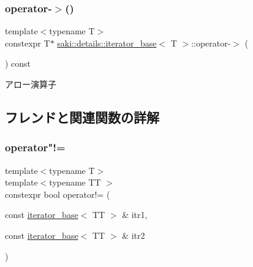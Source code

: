 \subsubsection{\texorpdfstring{operator-\/$>$()}{operator->()}}
{\footnotesize\ttfamily template$<$typename T$>$ \\
constexpr T$\ast$ \mbox{\hyperlink{classsaki_1_1details_1_1iterator__base}{saki\+::details\+::iterator\+\_\+base}}$<$ T $>$\+::operator-\/$>$ (\begin{DoxyParamCaption}{ }\end{DoxyParamCaption}) const\hspace{0.3cm}{\ttfamily [inline]}}



アロー演算子 



\subsection{フレンドと関連関数の詳解}
\mbox{\label{classsaki_1_1details_1_1iterator__base_a347d4c8755f8c350aa9c0151165549f2}} 
\subsubsection{\texorpdfstring{operator"!=}{operator!=}}
{\footnotesize\ttfamily template$<$typename T$>$ \\
template$<$typename TT $>$ \\
constexpr bool operator!= (\begin{DoxyParamCaption}\item[{const \mbox{\hyperlink{classsaki_1_1details_1_1iterator__base}{iterator\+\_\+base}}$<$ TT $>$ \&}]{itr1,  }\item[{const \mbox{\hyperlink{classsaki_1_1details_1_1iterator__base}{iterator\+\_\+base}}$<$ TT $>$ \&}]{itr2 }\end{DoxyParamCaption})\hspace{0.3cm}{\ttfamily [friend]}}

\mbox{\label{classsaki_1_1details_1_1iterator__base_a6ac6c0419a9e263f0f89741137499a83}} 
